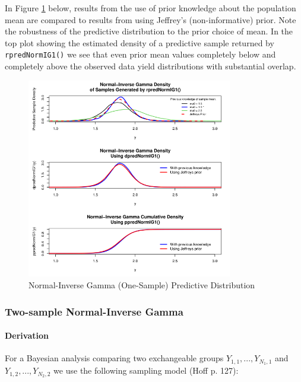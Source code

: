 \documentclass[12pt, a4paper]{article}
\begin{document}
\noindent In Figure \ref{fig:NormIG1dist} below, results from the use of prior knowledge about the population mean are compared to results from using Jeffrey's (non-informative) prior.  Note the robustness of the predictive distribution to the prior choice of mean.  In the top plot showing the estimated density of a predictive sample returned by \texttt{rpredNormIG1()} we see that even prior mean values completely below and completely above the observed data yield distributions with substantial overlap.\\

\begin{figure}[ht]
  \centering
  \includegraphics[width=0.8\textwidth]{./Graphics/DistributionPlots/NormIG1}
  \caption{Normal-Inverse Gamma (One-Sample) Predictive Distribution}
  \label{fig:NormIG1dist}
\end{figure}

\vspace{2cm}


\clearpage

    \subsubsection{Two-sample Normal-Inverse Gamma}
      \paragraph{Derivation}

        For a Bayesian analysis comparing two exchangeable groups $Y_{1,1},...,Y_{N_1,1}$ and $Y_{1,2},...,Y_{N_2,2}$ we use the following sampling model (Hoff p. 127):
\end{document}
